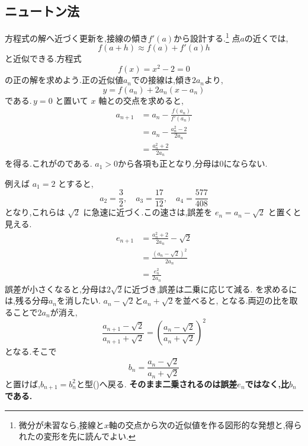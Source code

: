 \subsection{ニュートン法}\label{節：ニュートン法型}

方程式の解へ近づく更新を,接線の傾き$f'(a)$から設計する.\footnote{微分が未習なら,接線と$x$軸の交点から次の近似値を作る図形的な発想と,得られたの変形を先に読んでよい.}
点$a$の近くでは,
\[
  f(a+h) \approx f(a)+f'(a)h
\]
と近似できる.方程式
\[
  f(x)=x^2-2=0
\]
の正の解を求めよう.正の近似値$a_n$での接線は,傾き$2a_n$より,
\[
  y=f(a_n)+2a_n(x-a_n)
\]
である.\,$y=0$ と置いて $x$ 軸との交点を求めると,
\begin{align*}
  a_{n+1}
    &=a_n-\frac{f(a_n)}{f'(a_n)}\\
    &=a_n-\frac{a_n^2-2}{2a_n}\\
    &=\frac{a_n^2+2}{2a_n}
\end{align*}
を得る.これがのである.
$a_1>0$から各項も正となり,分母は0にならない.
  \BookFigNewton

例えば $a_1=2$ とすると,
\[
  a_2=\frac{3}{2},
  \quad
  a_3=\frac{17}{12},
  \quad
  a_4=\frac{577}{408}
\]
となり,これらは $\sqrt{2}$ に急速に近づく.この速さは,誤差を
$e_n=a_n-\sqrt{2}$ と置くと見える.
\begin{align*}
  e_{n+1}
    &=\frac{a_n^2+2}{2a_n}-\sqrt{2}\\
    &=\frac{(a_n-\sqrt{2})^2}{2a_n}\\
    &=\frac{e_n^2}{2a_n}
\end{align*}
誤差が小さくなると,分母は$2\sqrt2$に近づき,誤差は二乗に応じて減る.
を求めるには,残る分母$a_n$を消したい.
$a_n-\sqrt2$と$a_n+\sqrt2$を並べると,
\BookMathLayout{
\[
\begin{aligned}
a_{n+1}-\sqrt2&=\frac{(a_n-\sqrt2)^2}{2a_n},\\
a_{n+1}+\sqrt2&=\frac{(a_n+\sqrt2)^2}{2a_n}
\end{aligned}
\]
}{
\[
\begin{aligned}
a_{n+1}-\sqrt2&=\frac{(a_n-\sqrt2)^2}{2a_n},\\
a_{n+1}+\sqrt2&=\frac{(a_n+\sqrt2)^2}{2a_n}
\end{aligned}
\]
}
となる.両辺の比を取ることで$2a_n$が消え,
\[
  \frac{a_{n+1}-\sqrt{2}}{a_{n+1}+\sqrt{2}}
  =\left(\frac{a_n-\sqrt{2}}{a_n+\sqrt{2}}\right)^{2}
\]
となる.そこで
\[
  b_n=\frac{a_n-\sqrt{2}}{a_n+\sqrt{2}}
\]
と置けば,$b_{n+1}=b_n^2$と型()へ戻る.
\textbf{そのまま二乗されるのは誤差$e_n$ではなく,比$b_n$である.}


